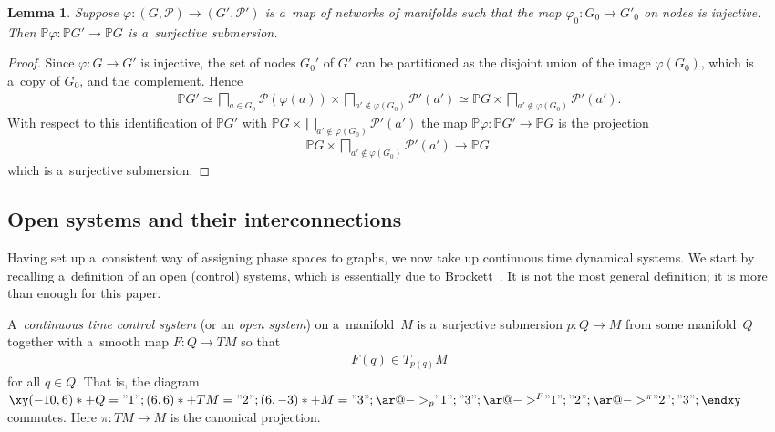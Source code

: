 \documentclass[pdftex]{sigma}
\numberwithin{equation}{section}
\newtheorem{Lemma}[Theorem]{Lemma}
\begin{document}
\begin{Lemma}
\label{lemma:2.inj}
Suppose $\varphi\colon (G,{\mathcal P})\to (G',{\mathcal P}')$ is a~map of networks of manifolds such that the map
$\varphi_0\colon G_0 \to G'_0$ on nodes is injective.
Then $\mathbb{P}\varphi\colon \mathbb{P} G'\to \mathbb{P} G$ is a~surjective submersion.
\end{Lemma}
\begin{proof}
Since $\varphi\colon G\to G'$ is injective, the set of nodes $G_0'$ of $G'$ can be partitioned as the disjoint union of
the image $\varphi(G_0)$, which is a~copy of $G_0$, and the complement.
Hence
\begin{gather*}
\mathbb{P} G' \simeq \bigsqcap_{a\in G_0} {\mathcal P}(\varphi(a)) \times \bigsqcap_{a'\not\in \varphi(G_0)} {\mathcal
P}' (a') \simeq \mathbb{P} G \times \bigsqcap_{a'\not\in \varphi(G_0)} {\mathcal P}' (a').
\end{gather*}
With respect to this identif\/ication of $\mathbb{P} G'$ with $\mathbb{P} G \times \bigsqcap\limits_{a'\not\in \varphi(G_0)}
{\mathcal P}' (a')$ the map $\mathbb{P}\varphi\colon \mathbb{P} G'\to \mathbb{P} G$ is the projection
\begin{gather*}
\mathbb{P} G \times \bigsqcap_{a'\not\in \varphi(G_0)} {\mathcal P}' (a') \to \mathbb{P} G.
\end{gather*}
which is a~surjective submersion.
\end{proof}

\subsection{Open systems and their interconnections}

\noindent Having set up a~consistent way of assigning phase spaces to graphs, we now take up continuous time dynamical
systems.
We start by recalling a~def\/inition of an open (control) systems, which is essentially due to Brockett~\cite{Brockett}.
It is not the most general def\/inition; it is more than enough for this paper.

\begin{Definition}
\label{def:open-sys}
A~{\it continuous time control system} (or an {\it open system}) on a~manifold~$M$ is a~surjective submersion $p\colon
Q\to M$ from some manifold~$Q$ together with a~smooth map $ F\colon Q \to TM$ so that
\begin{gather*}
F(q) \in T_{p(q)} M
\end{gather*}
for all $q\in Q $.
That is, the diagram $
\xy (-10, 6)*+{Q}="1";
(6, 6)*+{TM} ="2";
(6,-3)*+{M}="3";
{\ar@{->}_{ p}  "1";"3"};
{\ar@{->}^{F} "1";"2"};
{\ar@{->}^{\pi} "2";"3"}; \endxy
$ commutes.
Here $\pi\colon TM \to M$ is the canonical projection.
\end{Definition}
\end{document}
